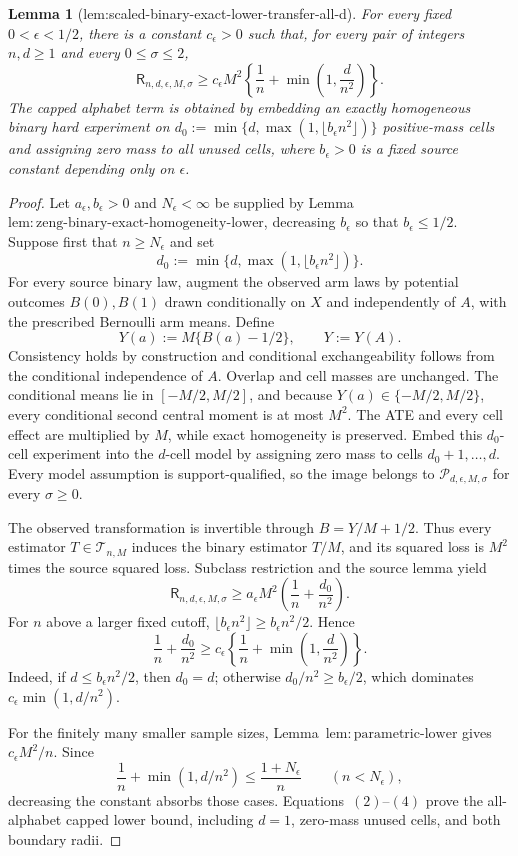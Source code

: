 \documentclass{article}
\newtheorem{lemma}{Lemma}
\begin{document}
\begin{lemma}[lem:scaled-binary-exact-lower-transfer-all-d]\label{lem:scaled-binary-exact-lower-transfer-all-d}
For every fixed \(0<\epsilon<1/2\), there is a constant \(c_{\epsilon}>0\) such that, for every pair of integers \(n,d\ge1\) and every \(0\le\sigma\le2\),
\[
 \mathsf R_{n,d,\epsilon,M,\sigma}
 \ge c_{\epsilon}M^2\left\{\frac1n+\min\left(1,\frac d{n^2}\right)\right\}.
\]
The capped alphabet term is obtained by embedding an exactly homogeneous binary hard experiment on \(d_0:=\min\{d,\max(1,\lfloor b_{\epsilon}n^2\rfloor)\}\) positive-mass cells and assigning zero mass to all unused cells, where \(b_{\epsilon}>0\) is a fixed source constant depending only on \(\epsilon\).
\end{lemma}
\begin{proof}
Let \(a_{\epsilon},b_{\epsilon}>0\) and \(N_{\epsilon}<\infty\) be supplied by Lemma~\(\mathrm{lem:zeng\text{-}binary\text{-}exact\text{-}homogeneity\text{-}lower}\), decreasing \(b_{\epsilon}\) so that \(b_{\epsilon}\le1/2\).  Suppose first that \(n\ge N_{\epsilon}\) and set
\[
 d_0:=\min\{d,\max(1,\lfloor b_{\epsilon}n^2\rfloor)\}.
\tag{1}
\]
For every source binary law, augment the observed arm laws by potential outcomes \(B(0),B(1)\) drawn conditionally on \(X\) and independently of \(A\), with the prescribed Bernoulli arm means.  Define
\[
 Y(a):=M\{B(a)-1/2\},\qquad Y:=Y(A).
\]
Consistency holds by construction and conditional exchangeability follows from the conditional independence of \(A\).  Overlap and cell masses are unchanged.  The conditional means lie in \([-M/2,M/2]\), and because \(Y(a)\in\{-M/2,M/2\}\), every conditional second central moment is at most \(M^2\).  The ATE and every cell effect are multiplied by \(M\), while exact homogeneity is preserved.  Embed this \(d_0\)-cell experiment into the \(d\)-cell model by assigning zero mass to cells \(d_0+1,\ldots,d\).  Every model assumption is support-qualified, so the image belongs to \(\mathcal P_{d,\epsilon,M,\sigma}\) for every \(\sigma\ge0\).

The observed transformation is invertible through \(B=Y/M+1/2\).  Thus every estimator \(T\in\mathcal T_{n,M}\) induces the binary estimator \(T/M\), and its squared loss is \(M^2\) times the source squared loss.  Subclass restriction and the source lemma yield
\[
 \mathsf R_{n,d,\epsilon,M,\sigma}
 \ge a_{\epsilon}M^2\left(\frac1n+\frac{d_0}{n^2}\right).
\tag{2}
\]
For \(n\) above a larger fixed cutoff, \(\lfloor b_{\epsilon}n^2\rfloor\ge b_{\epsilon}n^2/2\).  Hence
\[
 \frac1n+\frac{d_0}{n^2}
 \ge c_{\epsilon}\left\{\frac1n+\min\left(1,\frac d{n^2}\right)\right\}.
\tag{3}
\]
Indeed, if \(d\le b_{\epsilon}n^2/2\), then \(d_0=d\); otherwise \(d_0/n^2\ge b_{\epsilon}/2\), which dominates \(c_{\epsilon}\min(1,d/n^2)\).

For the finitely many smaller sample sizes, Lemma~\(\mathrm{lem:parametric\text{-}lower}\) gives \(c_{\epsilon}M^2/n\).  Since
\[
 \frac1n+\min(1,d/n^2)\le \frac{1+N_{\epsilon}}n
 \qquad (n<N_{\epsilon}),
\tag{4}
\]
decreasing the constant absorbs those cases.  Equations~\((2)\)--\((4)\) prove the all-alphabet capped lower bound, including \(d=1\), zero-mass unused cells, and both boundary radii.
\end{proof}
\end{document}
